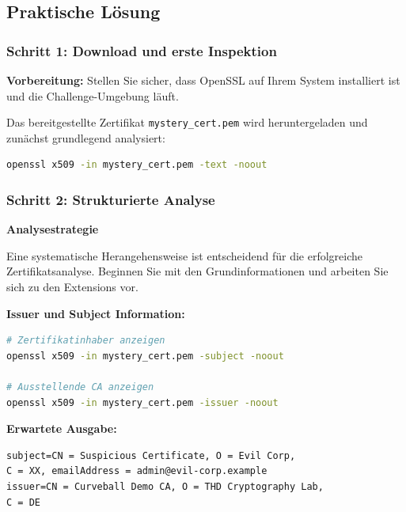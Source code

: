\documentclass{article}
\begin{document}
\subsection{Praktische Lösung}

\subsubsection{Schritt 1: Download und erste Inspektion}

\begin{warningbox}
\textbf{Vorbereitung:} Stellen Sie sicher, dass OpenSSL auf Ihrem System installiert ist und die Challenge-Umgebung läuft.
\end{warningbox}

Das bereitgestellte Zertifikat \texttt{mystery\_cert.pem} wird heruntergeladen und zunächst grundlegend analysiert:

\begin{lstlisting}[language=bash,caption={Grundlegende Zertifikatsinformationen}]
openssl x509 -in mystery_cert.pem -text -noout
\end{lstlisting}

\subsubsection{Schritt 2: Strukturierte Analyse}

\begin{infobox}
\textbf{Analysestrategie}

Eine systematische Herangehensweise ist entscheidend für die erfolgreiche Zertifikatsanalyse. Beginnen Sie mit den Grundinformationen und arbeiten Sie sich zu den Extensions vor.
\end{infobox}

\textbf{Issuer und Subject Information:}
\begin{lstlisting}[language=bash]
# Zertifikatinhaber anzeigen
openssl x509 -in mystery_cert.pem -subject -noout

# Ausstellende CA anzeigen  
openssl x509 -in mystery_cert.pem -issuer -noout
\end{lstlisting}

\textbf{Erwartete Ausgabe:}
\begin{lstlisting}[caption=Zertifikatsinformationen]
subject=CN = Suspicious Certificate, O = Evil Corp, 
C = XX, emailAddress = admin@evil-corp.example
issuer=CN = Curveball Demo CA, O = THD Cryptography Lab, 
C = DE
\end{lstlisting}
\end{document}

